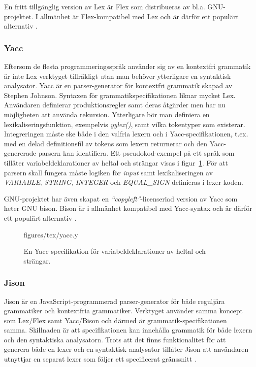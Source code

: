 En fritt tillgänglig version av Lex är Flex som distribueras av bl.a.
GNU-projektet. I allmänhet är Flex-kompatibel med Lex och är därför ett
populärt alternativ \citep[s. 279]{bd92}.

\subsubsection{Yacc}

Eftersom de flesta programmeringsspråk använder sig av en kontextfri grammatik
är inte Lex verktyget tillräkligt utan man behöver ytterligare en syntaktisk
analysator. Yacc är en parser-generator för kontextfri grammatik skapad av
Stephen Johnson. Syntaxen för grammatikspecifikationen liknar mycket Lex.
Användaren definierar produktionsregler samt deras åtgärder men har nu
möjligheten att använda rekursion. Ytterligare bör man definiera en
lexikaliseringsfunktion, exempelvis \textit{yylex()}, samt vilka tokentyper
som existerar. Integreringen måste ske både i den valfria lexern och i
Yacc-specifikationen, t.ex. med en delad definitionsfil av tokens som lexern
returnerar och den Yacc-genererade parsern kan identifiera. Ett
pseudokod-exempel på ett språk som tillåter variabeldeklarationer av heltal
och strängar visas i figur~\ref{fig:yacc}. För att parsern skall fungera
måste logiken för \textit{input} samt lexikaliseringen av \textit{VARIABLE},
\textit{STRING}, \textit{INTEGER} och \textit{EQUAL_SIGN} definieras i lexer
koden.

GNU-projektet har även skapat en \textit{``copyleft''}-licenseriad version av Yacc som
heter GNU bison. Bison är i allmänhet kompatibel med Yacc-syntax och är därför
ett populärt alternativ \citep[s. 277]{bd92}.

\begin{figure}[ht]
    {figures/tex/yacc.y}
  \caption{En Yacc-specifikation för variabeldeklarationer av heltal och
    strängar.}
  \label{fig:yacc}
\end{figure}

\subsubsection{Jison}

Jison är en JavaScript-programmerad parser-generator för både reguljära grammatiker
och kontextfria grammatiker. Verktyget använder samma koncept som Lex/Flex
samt Yacc/Bison och därmed är grammatik-specifikationen samma. Skillnaden är
att specifikationen kan innehålla grammatik för både lexern och den
syntaktiska analysatorn. Trots att det finns funktionalitet för att generera
både en lexer och en syntaktisk analysator tillåter Jison att användaren
utnyttjar en separat lexer som följer ett specificerat gränssnitt
\citep{jison}.

